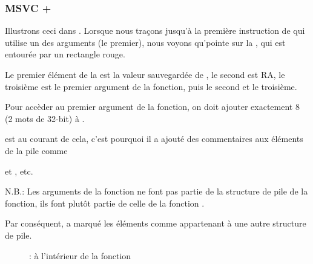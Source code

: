 \subsubsection{MSVC + \olly}
\myindex{\olly}
Illustrons ceci dans \olly.
Lorsque nous traçons jusqu'à la première instruction de \ttf qui utilise un des
arguments (le premier), nous voyons qu'\EBP pointe sur la ,
qui est entourée par un rectangle rouge. 

Le premier élément de la  est la
valeur sauvegardée de \EBP, le second est \ac{RA}, le troisième est le premier
argument de la fonction, puis le second et le troisième.

Pour accèder au premier argument de la fonction, on doit ajouter exactement 8 (2
mots de 32-bit) à \EBP.

\olly est au courant de cela, c'est pourquoi il a ajouté des commentaires aux éléments
de la pile comme

 et , etc.

N.B.: Les arguments de la fonction ne font pas partie de la structure de pile de
la fonction, ils font plutôt partie de celle de la fonction .

Par conséquent, \olly a marqué les éléments comme appartenant à une autre structure
de pile.

\begin{figure}[H]
\centering
{}
\caption{\olly: à l'intérieur de la fonction \ttf{}}
\label{fig:passing_arguments_olly}
\end{figure}

